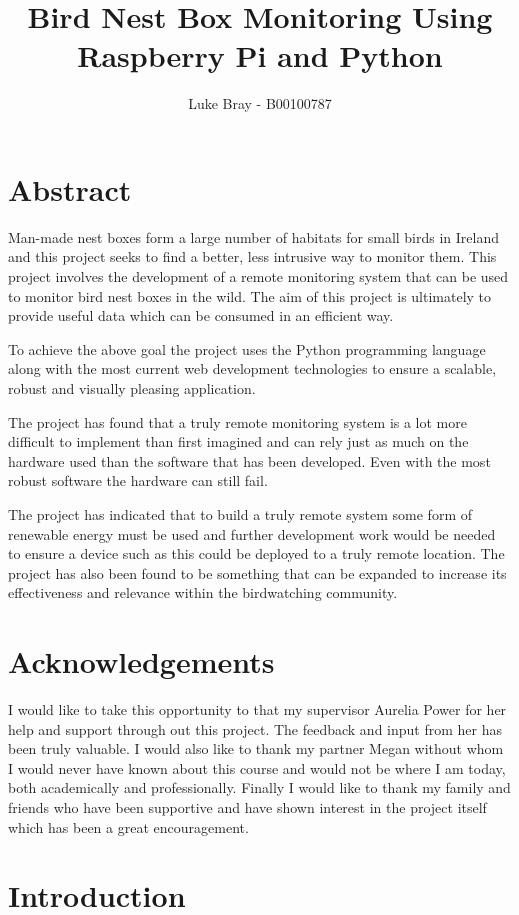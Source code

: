 \documentclass[10pt,a4paper]{article}
\author{Luke Bray - B00100787}
\title{Bird Nest Box Monitoring Using Raspberry Pi and Python}
\begin{document}

\pagebreak
\section{Abstract}
Man-made nest boxes form a large number of habitats for small birds in Ireland and this project seeks to find a better, less intrusive way to monitor them. 
This project involves the development of a remote monitoring system that can be used to monitor bird nest boxes in the wild. The aim of this project is ultimately to provide useful data which can be consumed in an efficient way. 

To achieve the above goal the project uses the Python programming language along with the most current web development technologies to ensure a scalable, robust and visually pleasing application. 

The project has found that a truly remote monitoring system is a lot more difficult to implement than first imagined and can rely just as much on the hardware used than the software that has been developed. Even with the most robust software the hardware can still fail. 

The project has indicated that to build a truly remote system some form of renewable energy must be used and further development work would be needed to ensure a device such as this could be deployed to a truly remote location. The project has also been found to be something that can be expanded to increase its effectiveness and relevance within the birdwatching community. 

\pagebreak
\section{Acknowledgements}
I would like to take this opportunity to that my supervisor Aurelia Power for her help and support through out this project. The feedback and input from her has been truly valuable.
I would also like to thank my partner Megan without whom I would never have known about this course and would not be where I am today, both academically and professionally. 
Finally I would like to thank my family and friends who have been supportive and have shown interest in the project itself which has been a great encouragement.  
\pagebreak
\tableofcontents
\pagebreak
\section{Introduction}
\end{document}
